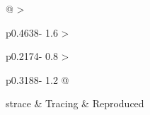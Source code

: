 \documentclass{article}
\newcommand\tcap{}
\renewenvironment{longtable}{\begin{center}\bottomcaption{\tcap}\begin{supertabular}}{\end{supertabular}\end{center}}
\begin{document}
\begin{longtable}[]{
  @{}
  >{\raggedright\arraybackslash}p{0.4638\columnwidth - 1.6\tabcolsep}
  >{\raggedright\arraybackslash}p{0.2174\columnwidth - 0.8\tabcolsep}
  >{\raggedright\arraybackslash}p{0.3188\columnwidth - 1.2\tabcolsep}
  @{}
}
strace & Tracing & Reproduced \\
\end{longtable}

\normalsize
\end{document}

